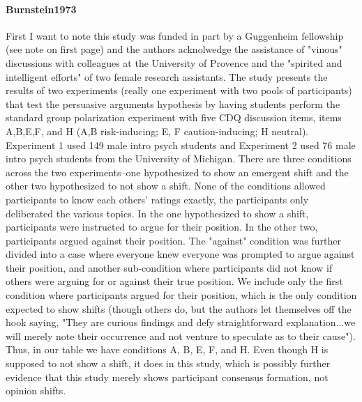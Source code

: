 \documentclass[11pt, letterpaper]{article}
\begin{document}
\paragraph{{Burnstein1973}} First I want to note this study was funded in part by a Guggenheim fellowship (see
note on first page) and the authors acknolwedge the assistance of "vinous" discussions with colleagues at the
University of Provence and the "spirited and intelligent efforts" of two female research assistants. The study
presents the results of two experiments (really one experiment with two pools of participants) that test the
persuasive arguments hypothesis by having students perform the standard group polarization experiment with five CDQ
discussion items, items A,B,E,F, and H (A,B risk-inducing; E, F caution-inducing; H neutral). Experiment 1 used 149
male intro psych students and Experiment 2 used 76 male intro psych students from the University of Michigan. There
are three conditions across the two experiments--one hypothesized to show an emergent shift and the other two
hypothesized to not show a shift. None of the conditions allowed participants to know each others' ratings exactly,
the participants only deliberated the various topics. In the one hypothesized to show a shift, participants were
instructed to argue for their position. In the other two, participants argued against their position. The "against"
condition was further divided into a case where everyone knew everyone was prompted to argue against their position,
and another sub-condition where participants did not know if others were arguing for or against their true position.
We include only the first condition where participants argued for their position, which is the only condition
expected to show shifts (though others do, but the authors let themselves off the hook saying, "They are curious
findings and defy straightforward explanation...we will merely note their occurrence and not venture to speculate as
to their cause"). Thus, in our table we have conditions A, B, E, F, and H. Even though H is supposed to not show a
shift, it does in this study, which is possibly further evidence that this study merely shows participant consensus
formation, not opinion shifts.
\end{document}
